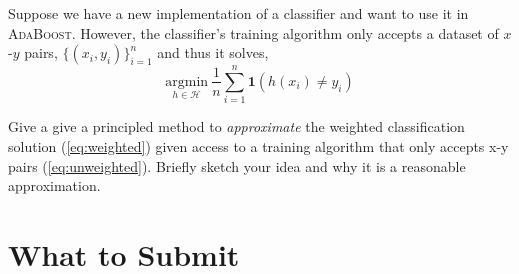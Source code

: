 \documentclass[11pt]{article}
\begin{document}
{\begin{enumerate}[(1)]
  Suppose we have a new implementation of a classifier and want to use it in
  \textsc{AdaBoost}.  However, the classifier's training algorithm only accepts
  a dataset of $x$-$y$ pairs, $\{ (x_i, y_i) \}_{i=1}^n$ and thus it solves,
%
\begin{equation}\label{eq:unweighted}
  \underset{h \in \mathcal{H}}{\mathrm{argmin}}\ \frac{1}{n} \sum_{i=1}^n \boldsymbol{1}(h(x_i) \ne y_i)
\end{equation}

Give a give a principled method to \emph{approximate} the weighted
classification solution (\ref{eq:weighted}) given access to a training algorithm
that only accepts x-y pairs (\ref{eq:unweighted}).  Briefly sketch your idea and
why it is a reasonable approximation.

  \begin{answertext}{13cm}{}

  \end{answertext}

\end{enumerate}

}

\newpage
\section{What to Submit}
\end{document}
